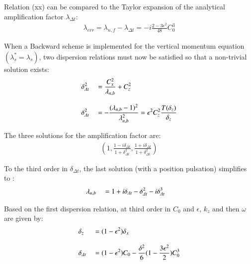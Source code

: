 \documentclass[a4paper,11pt]{article}
\begin{document}
Relation (xx) can be compared to the Taylor expansion of the analytical amplification factor $\lambda_{\Delta t}$:
\begin{equation}
   \begin{split}
    \displaystyle
     \lambda_{err}=\lambda_{n,f}-\lambda_{\Delta t}=
     -i\frac{ 2 - 3 \epsilon^2 }{48}C_0^3
   \end{split}
\end{equation}

When a Backward scheme is implemented for the vertical momentum equation $(\lambda_s^*=\lambda_s)$, two dispersion relations must now be satisfied so that a non-trivial solution exists:
\begin{equation}
   \begin{split}
    \displaystyle
    & \delta_{\Delta t}^2 && = \frac{C_x^2}{\lambda_{n,b}} + C_z^2  \\[3mm]
    \displaystyle
    & \delta_{\Delta t}^2 && = -\frac{(\lambda_{n,b}-1)^2}{\lambda_{n,b}^2}
      =\epsilon^2 C_z^2 \frac{T(\delta_z)}{\delta_z}
   \end{split}
\end{equation}


The three solutions for the amplification factor are:
\begin{equation}
   \begin{split}
    \displaystyle
    (1,\frac{1-i\delta_{\Delta t}}{1+\delta_{\Delta t}^2},\frac{1+i\delta_{\Delta t}}{1+\delta_{\Delta t}^2})
   \end{split}
\end{equation}

To the third order in $\delta_{\Delta t}$, the last solution (with a position pulsation) simplifies to :\\
\begin{equation}
   \begin{split}
    \displaystyle
    & \lambda_{n,b} &&=1+i \delta_{\Delta t} - \delta_{\Delta t}^2 -i \delta_{\Delta t}^3
   \end{split}
\end{equation}

Based on the first dispersion relation, at third order in $C_0$ and $\epsilon $, $k_z$  and then $\omega$ are given by:
\begin{equation}
   \begin{split}
    \displaystyle
    & \delta_{z} &&=(1-\epsilon^2)\delta_x\\[3mm]
    \displaystyle
    & \delta_{\Delta t} &&=(1-\epsilon^2)C_0-\frac{\delta^2}{6}(1-\frac{3\epsilon^2}{2})C_0^3
   \end{split}
\end{equation}
 
\end{document}
